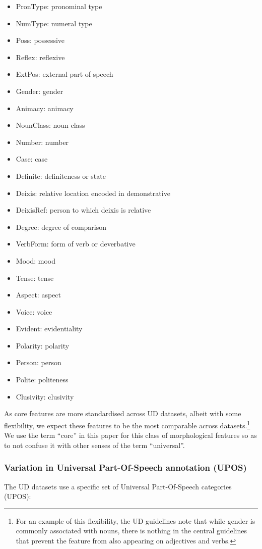 \documentclass[USenglish]{article}
\begin{document}
\begin{itemize}
    \item PronType: pronominal type 
    \item NumType: numeral type
    \item Poss: possessive
    \item Reflex: reflexive
    \item ExtPos: external part of speech
    \item Gender: gender
    \item Animacy: animacy
    \item NounClass: noun class
    \item Number: number
    \item Case: case
    \item Definite: definiteness or state
    \item Deixis: relative location encoded in demonstrative
    \item DeixisRef: person to which deixis is relative
    \item Degree: degree of comparison
    \item VerbForm: form of verb or deverbative
    \item Mood: mood 
    \item Tense: tense
    \item Aspect: aspect 
    \item Voice: voice
    \item Evident: evidentiality
    \item Polarity: polarity
    \item Person: person
    \item Polite: politeness
    \item Clusivity: clusivity
\end{itemize}

As core features are more standardised across UD datasets, albeit with some flexibility, we expect these features to be the most comparable across datasets.\footnote{For an example of this flexibility, the UD guidelines note that while gender is commonly associated with nouns, there is nothing in the central guidelines that prevent the feature from also appearing on adjectives and verbs.}
We use the term ``core'' in this paper for this class of morphological features so as to not confuse it with other senses of the term ``universal''.

\subsubsection{Variation in Universal Part-Of-Speech annotation (UPOS)}
The UD datasets use a specific set of Universal Part-Of-Speech categories (UPOS):
\end{document}
